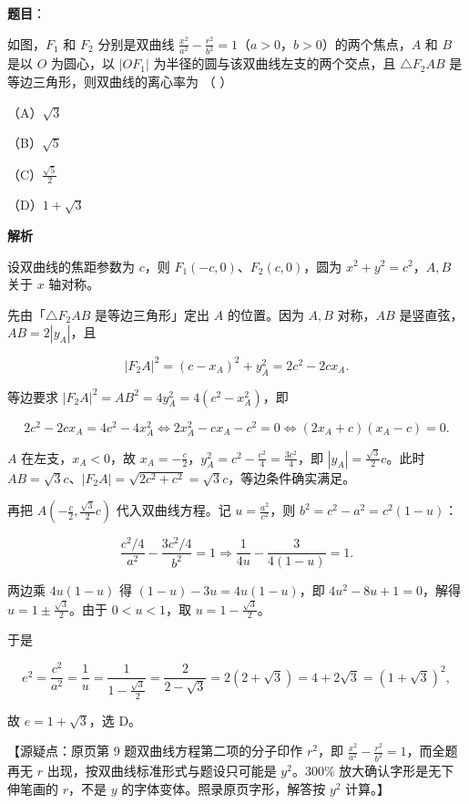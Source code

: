 \begin{answer}

\textbf{题目}：

如图，$F_1$ 和 $F_2$ 分别是双曲线 $\frac{x^2}{a^2}-\frac{r^2}{b^2}=1$（$a>0$，$b>0$）的两个焦点，$A$ 和 $B$ 是以 $O$ 为圆心，以 $|OF_1|$ 为半径的圆与该双曲线左支的两个交点，且 $\triangle F_2AB$ 是等边三角形，则双曲线的离心率为 （ ）
\nopagebreak[4]
\begin{center}\end{center}
\nopagebreak[4]
（A）$\sqrt3$

（B）$\sqrt5$

（C）$\frac{\sqrt5}{2}$

（D）$1+\sqrt3$

\textbf{解析}

设双曲线的焦距参数为 $c$，则 $F_1(-c,0)$、$F_2(c,0)$，圆为 $x^2+y^2=c^2$，$A,B$ 关于 $x$ 轴对称。

先由「$\triangle F_2AB$ 是等边三角形」定出 $A$ 的位置。因为 $A,B$ 对称，$AB$ 是竖直弦，$AB=2|y_A|$，且

\nopagebreak[4]
\[|F_2A|^2=(c-x_A)^2+y_A^2=2c^2-2cx_A.\]

等边要求 $|F_2A|^2=AB^2=4y_A^2=4(c^2-x_A^2)$，即

\nopagebreak[4]
\[2c^2-2cx_A=4c^2-4x_A^2\iff 2x_A^2-cx_A-c^2=0\iff (2x_A+c)(x_A-c)=0.\]

$A$ 在左支，$x_A<0$，故 $x_A=-\frac c2$，$y_A^2=c^2-\frac{c^2}{4}=\frac{3c^2}{4}$，即 $|y_A|=\frac{\sqrt3}{2}c$。此时 $AB=\sqrt3c$、$|F_2A|=\sqrt{2c^2+c^2}=\sqrt3c$，等边条件确实满足。

再把 $A\left(-\frac c2,\frac{\sqrt3}{2}c\right)$ 代入双曲线方程。记 $u=\frac{a^2}{c^2}$，则 $b^2=c^2-a^2=c^2(1-u)$：

\nopagebreak[4]
\[\frac{c^2/4}{a^2}-\frac{3c^2/4}{b^2}=1\Longrightarrow\frac{1}{4u}-\frac{3}{4(1-u)}=1.\]

两边乘 $4u(1-u)$ 得 $(1-u)-3u=4u(1-u)$，即 $4u^2-8u+1=0$，解得 $u=1\pm\frac{\sqrt3}{2}$。由于 $0<u<1$，取 $u=1-\frac{\sqrt3}{2}$。

于是

\nopagebreak[4]
\[e^2=\frac{c^2}{a^2}=\frac1u=\frac{1}{1-\frac{\sqrt3}{2}}=\frac{2}{2-\sqrt3}=2(2+\sqrt3)=4+2\sqrt3=(1+\sqrt3)^2,\]

故 $e=1+\sqrt3$，选 D。

【源疑点：原页第 9 题双曲线方程第二项的分子印作 $r^2$，即 $\frac{x^2}{a^2}-\frac{r^2}{b^2}=1$，而全题再无 $r$ 出现，按双曲线标准形式与题设只可能是 $y^2$。300\% 放大确认字形是无下伸笔画的 $r$，不是 $y$ 的字体变体。照录原页字形，解答按 $y^2$ 计算。】


\end{answer}
